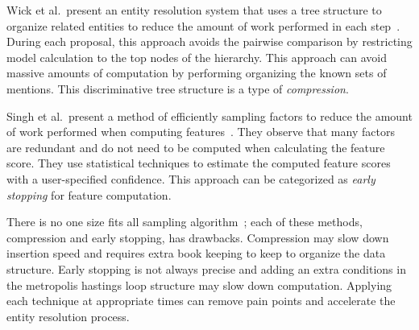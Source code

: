 Wick et al.\ present an entity resolution system that uses a tree structure
to organize related entities to reduce the amount of work performed in each step~\cite{wick2013discriminative}.
During each proposal, this approach avoids the pairwise comparison by restricting model calculation to the top nodes of the hierarchy.
This approach can avoid massive amounts of computation by performing organizing the known sets of mentions.
This discriminative tree structure is a type of \textit{compression}.

Singh et al.\ present a method of efficiently sampling factors to reduce the
amount of work performed when computing features~\cite{singh2012monte}.
They observe that many factors are redundant and do not need to be computed when calculating the feature score.
They use statistical techniques to estimate the computed feature scores with a user-specified confidence.
This approach can be categorized as \textit{early stopping} for feature computation.

There is no one size fits all sampling algorithm~\cite{sculley2006compression};
each of these methods, compression and early stopping, has drawbacks.
Compression may slow down insertion speed and requires extra book keeping to keep to organize the data structure.
Early stopping is not always precise and adding an extra conditions in the metropolis hastings loop structure may slow down computation.
Applying each technique at appropriate times can remove pain points and accelerate the entity resolution process.

